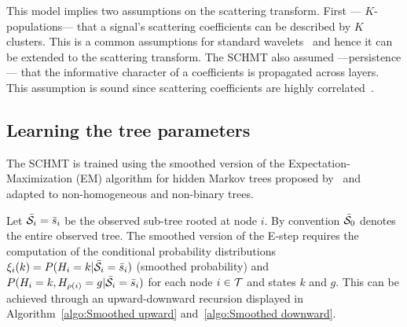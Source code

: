 \documentclass{article}
\begin{document}
    
    This model implies two assumptions on the scattering transform. First --- $K$-populations--- that a signal’s scattering coefficients can be described by $K$ clusters. This is a common assumptions for standard wavelets~\cite{kingsbury2001complex} and hence it can be extended to the scattering transform. The SCHMT also assumed ---persistence--- that the informative character of a coefficients is propagated across layers. This assumption is sound since scattering coefficients are highly correlated~\cite{oyallon2014deep}.
    
  \subsection{Learning the tree parameters}
    \label{subsec:SCHMT/Learning}    

    The SCHMT is trained using the smoothed version of the Expectation-Maximization (EM) algorithm \cite{someone} for hidden Markov trees proposed by~\cite{durand2004computational} and adapted to non-homogeneous and non-binary trees.
    
    Let $\bar{\mathcal{S}}_{i}= \bar{s}_{i}$ be the observed sub-tree rooted at node $i$. By convention $\bar{\mathcal{S}}_{0}$ denotes the entire observed tree. The smoothed version of the E-step requires the computation of the conditional probability distributions $\xi_{i}(k) = P(H_{i}=k | \bar{\mathcal{S}}_{i}= \bar{s}_{i})$ (smoothed probability) and $P(H_{i}=k, H_{\rho(i)}=g | \bar{\mathcal{S}}_{i}= \bar{s}_{i})$ for each node $i \in \mathcal{T}$ and states $k$ and $g$. This can be achieved through an upward-downward recursion displayed in Algorithm~\ref{algo:Smoothed upward} and~\ref{algo:Smoothed downward}.
    
\end{document}
